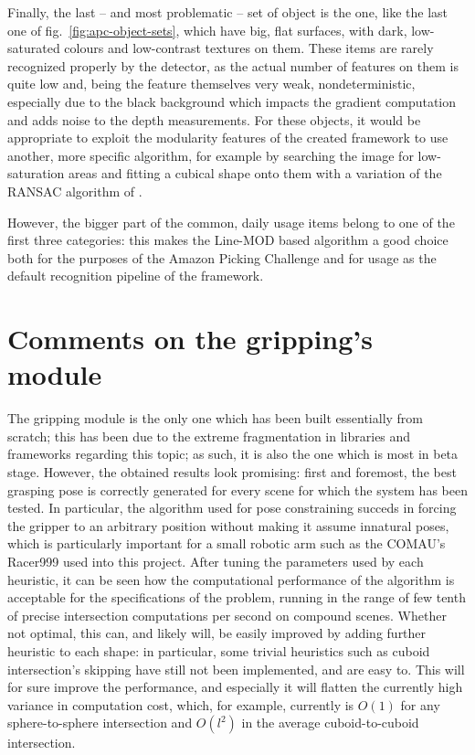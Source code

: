 Finally, the last -- and most problematic -- set of object is the one,
like the last one of fig.~\ref{fig:apc-object-sets}, which have big,
flat surfaces, with dark, low-saturated colours and low-contrast
textures on them. These items are rarely recognized properly by the
detector, as the actual number of features on them is quite low and,
being the feature themselves very weak, nondeterministic, especially
due to the black background which impacts the gradient computation and
adds noise to the depth measurements. For these objects, it would be
appropriate to exploit the modularity features of the created
framework to use another, more specific algorithm, for example by
searching the image for low-saturation areas and fitting a cubical
shape onto them with a variation of the RANSAC algorithm of \cite{ransac}.

However, the bigger part of the common, daily usage items belong to
one of the first three categories: this makes the Line-MOD based
algorithm a good choice both for the purposes of the Amazon Picking
Challenge and for usage as the default recognition pipeline of the
framework.

\section{Comments on the gripping's module}
The gripping module is the only one which has been built essentially from scratch;
this has been due to the extreme fragmentation in libraries and
frameworks regarding this topic; as such, it is also the one which is
most in beta stage. However, the obtained results look promising:
first and foremost, the best grasping pose is correctly generated for
every scene for which the system has been tested. In particular, the
algorithm used for pose constraining succeds in forcing the gripper to
an arbitrary position without making it assume innatural poses, which
is particularly important for a small robotic arm such as the COMAU's
Racer999 used into this project.
After tuning the parameters used by each heuristic, it can be seen how
the computational performance of the algorithm is acceptable for the
specifications of the problem, running in the range of few tenth of
precise intersection computations per second on compound
scenes. Whether not optimal, this can, and likely will, be easily
improved by adding further heuristic to each shape: in particular,
some trivial heuristics such as cuboid intersection's skipping have
still not been implemented, and are easy to. This will for sure
improve the performance, and especially it will flatten the currently
high variance in computation cost, which, for example, currently is
$O(1)$ for any sphere-to-sphere intersection and $O(l^2)$ in the
average cuboid-to-cuboid intersection.

